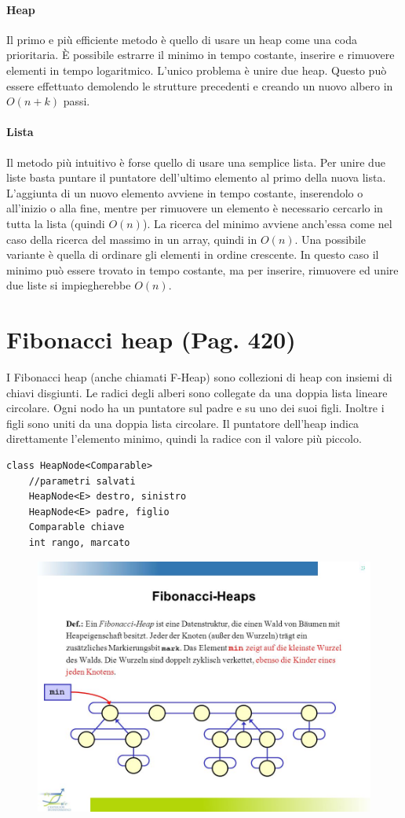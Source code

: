 \documentclass[a4paper]{book}
\newcommand{\lstIndent}{4}
\begin{document}
\paragraph*{Heap}
Il primo e più efficiente metodo è quello di usare un heap come una coda prioritaria. È possibile estrarre il minimo in tempo costante, inserire e rimuovere elementi in tempo logaritmico. L'unico problema è unire due heap. Questo può essere effettuato demolendo le strutture precedenti e creando un nuovo albero in $O(n+k)$ passi.
\paragraph*{Lista}
Il metodo più intuitivo è forse quello di usare una semplice lista. Per unire due liste basta puntare il puntatore dell'ultimo elemento al primo della nuova lista. L'aggiunta di un nuovo elemento avviene in tempo costante, inserendolo o all'inizio o alla fine, mentre per rimuovere un elemento è necessario cercarlo in tutta la lista (quindi $O(n)$). La ricerca del minimo avviene anch'essa come nel caso della ricerca del massimo in un array, quindi in $O(n)$. Una possibile variante è quella di ordinare gli elementi in ordine crescente. In questo caso il minimo può essere trovato in tempo costante, ma per inserire, rimuovere ed unire due liste si impiegherebbe $O(n)$.
\section{Fibonacci heap (Pag. 420)}
I Fibonacci heap (anche chiamati F-Heap) sono collezioni di heap con insiemi di chiavi disgiunti. Le radici degli alberi sono collegate da una doppia lista lineare circolare. Ogni nodo ha un puntatore sul padre e su uno dei suoi figli. Inoltre i figli sono uniti da una doppia lista circolare. Il puntatore dell'heap indica direttamente l'elemento minimo, quindi la radice con il valore più piccolo.
\begin{lstlisting}[tabsize=\lstIndent]
class HeapNode<Comparable>
	//parametri salvati
	HeapNode<E> destro, sinistro
	HeapNode<E> padre, figlio
	Comparable chiave
	int rango, marcato
\end{lstlisting}
\begin{figure}[H]
\centering
\includegraphics[scale=0.5]{Figures/fheap.jpg}
\end{figure}
\end{document}
